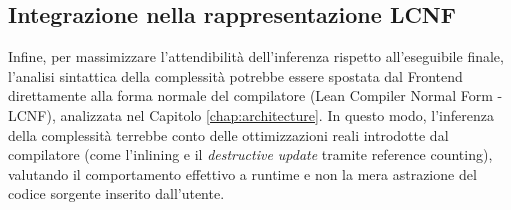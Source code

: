 \subsection{Integrazione nella rappresentazione LCNF}
Infine, per massimizzare l'attendibilità dell'inferenza rispetto all'eseguibile finale, l'analisi sintattica della complessità potrebbe essere spostata dal Frontend 
direttamente alla forma normale del compilatore (Lean Compiler Normal Form - LCNF), analizzata nel Capitolo \ref{chap:architecture}. In questo modo, l'inferenza della 
complessità terrebbe conto delle ottimizzazioni reali introdotte dal compilatore (come l'inlining e il \textit{destructive update} tramite reference counting), valutando 
il comportamento effettivo a runtime e non la mera astrazione del codice sorgente inserito dall'utente.